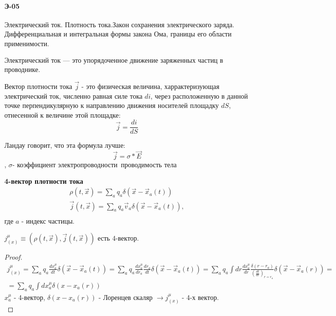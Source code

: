 \documentclass[__main__.tex]{subfiles}
\begin{document}
\paragraph{Э-05}
Электрический ток. Плотность тока.Закон сохранения электрического заряда. Дифференциальная и интегральная формы закона Ома, границы его области применимости.\\

\begin{definition}
	Электрический ток — это упорядоченное движение заряженных частиц в проводнике. 
\end{definition}

\begin{definition}
	Вектор плотности тока $\vec{j}$ - это физическая величина, харрактеризующая электрический ток, численно равная силе тока $di$, через расположенную в данной точке перпендикулярную к направлению движения носителей площадку $dS$, отнесенной к величине этой площадке:
	$$\vec{j}=\frac{di}{dS}$$
\end{definition}
Ландау говорит, что эта формула лучше:
$$\vec{j}=σ*\vec{E}$$,
$σ$- коэффициент электропроводности\ проводимость тела

\textbf{4-вектор плотности тока}\\
\begin{gather*}
	\rho(t, \vec x) = \sum_a q_a \delta(\vec x - \vec x_a(t))\\
	\vec j(t, \vec x) = \sum_a q_a \vec v_a \delta(\vec x - \vec x_a(t)),\\
\end{gather*}
где $a$ - индекс частицы.
\begin{statement}
	$j^\mu_{(x)}\equiv \left(\rho(t, \vec x), \vec j(t, \vec x) \right)$ есть 4-вектор.
\end{statement}
\begin{proof}
	\begin{gather*}
		j^\mu_{(x)} = \sum_a q_a \frac{dx_a^\mu}{dt} \delta(\vec x - \vec x_a(t)) = \sum_a q_a \frac{dx_a^\mu}{dr_a} \frac{dr_a}{dt}\delta(\vec x - \vec x_a(t)) = \sum_a q_a \int dr \frac{dx_a^\mu}{dr}\frac{\delta (r - r_a)}{\left(\frac{dt}{dr}\right)_{r=r_a}}\delta(\vec x - \vec x_a(r)) = \\
		= \sum_a q_a \int dx_a^\mu \delta(x - x_a(r))
	\end{gather*}
	$x^\mu_a$ - 4-вектор, $\delta(x - x_a(r))$ - Лоренцев скаляр $\rightarrow j^\mu_{(x)}$ - 4-х вектор.\\
\end{proof}
\end{document}
